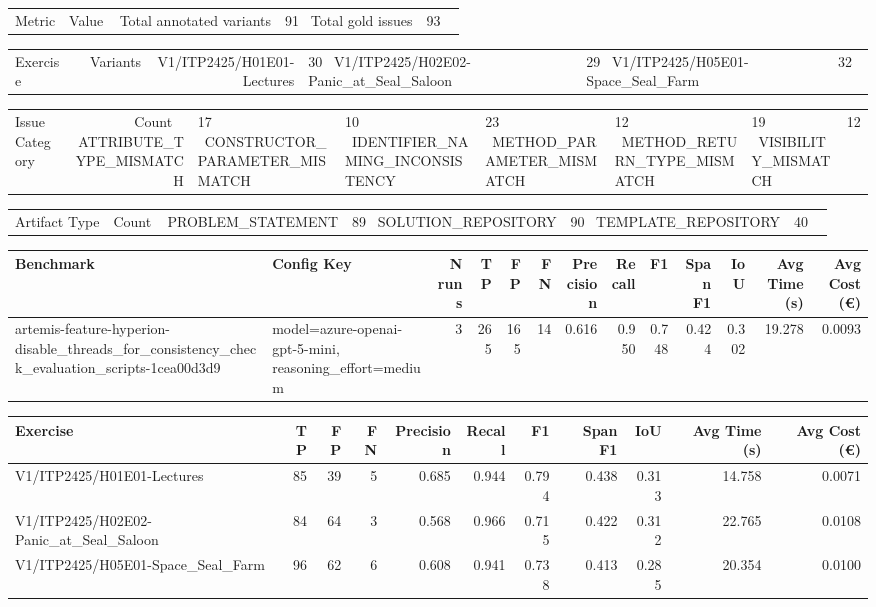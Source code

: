 \begin{tabular}{lr}
Metric & Value \
\hline
Total annotated variants & 91 \
Total gold issues & 93 \
\end{tabular}

\begin{tabular}{lr}
Exercise & Variants \
\hline
V1/ITP2425/H01E01-Lectures & 30 \
V1/ITP2425/H02E02-Panic\_at\_Seal\_Saloon & 29 \
V1/ITP2425/H05E01-Space\_Seal\_Farm & 32 \
\end{tabular}

\begin{tabular}{lr}
Issue Category & Count \
\hline
ATTRIBUTE\_TYPE\_MISMATCH & 17 \
CONSTRUCTOR\_PARAMETER\_MISMATCH & 10 \
IDENTIFIER\_NAMING\_INCONSISTENCY & 23 \
METHOD\_PARAMETER\_MISMATCH & 12 \
METHOD\_RETURN\_TYPE\_MISMATCH & 19 \
VISIBILITY\_MISMATCH & 12 \
\end{tabular}

\begin{tabular}{lr}
Artifact Type & Count \
\hline
PROBLEM\_STATEMENT & 89 \
SOLUTION\_REPOSITORY & 90 \
TEMPLATE\_REPOSITORY & 40 \
\end{tabular}

\begin{tabular}{llrrrrrrrrrrr}
Benchmark & Config Key & N runs & TP & FP & FN & Precision & Recall & F1 & Span F1 & IoU & Avg Time (s) & Avg Cost (€) \\
\hline
artemis-feature-hyperion-disable\_threads\_for\_consistency\_check\_evaluation\_scripts-1cea00d3d9 & model=azure-openai-gpt-5-mini, reasoning\_effort=medium & 3 & 265 & 165 & 14 & 0.616 & 0.950 & 0.748 & 0.424 & 0.302 & 19.278 & 0.0093 \\
\end{tabular}

\begin{tabular}{lrrrrrrrrrr}
Exercise & TP & FP & FN & Precision & Recall & F1 & Span F1 & IoU & Avg Time (s) & Avg Cost (€) \\
\hline
V1/ITP2425/H01E01-Lectures & 85 & 39 & 5 & 0.685 & 0.944 & 0.794 & 0.438 & 0.313 & 14.758 & 0.0071 \\
V1/ITP2425/H02E02-Panic\_at\_Seal\_Saloon & 84 & 64 & 3 & 0.568 & 0.966 & 0.715 & 0.422 & 0.312 & 22.765 & 0.0108 \\
V1/ITP2425/H05E01-Space\_Seal\_Farm & 96 & 62 & 6 & 0.608 & 0.941 & 0.738 & 0.413 & 0.285 & 20.354 & 0.0100 \\
\end{tabular}
